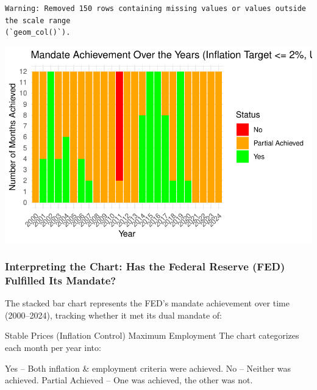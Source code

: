 \documentclass[
  letterpaper,
  DIV=11,
  numbers=noendperiod]{scrartcl}
\begin{document}
\begin{verbatim}
Warning: Removed 150 rows containing missing values or values outside the scale range
(`geom_col()`).
\end{verbatim}

\includegraphics{Assignment2_Data608_Quarto_files/figure-pdf/unnamed-chunk-32-1.pdf}

\subsubsection{Interpreting the Chart: Has the Federal Reserve (FED)
Fulfilled Its
Mandate?}\label{interpreting-the-chart-has-the-federal-reserve-fed-fulfilled-its-mandate}

The stacked bar chart represents the FED's mandate achievement over time
(2000--2024), tracking whether it met its dual mandate of:

Stable Prices (Inflation Control) Maximum Employment The chart
categorizes each month per year into:

Yes -- Both inflation \& employment criteria were achieved. No --
Neither was achieved. Partial Achieved -- One was achieved, the other
was not.
\end{document}
